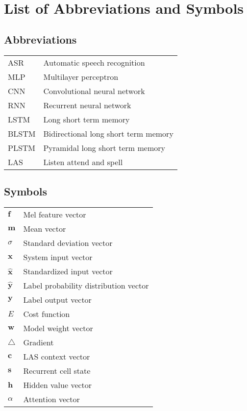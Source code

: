 \documentclass[master=ewit,english,coverpageonly]{kulemt}
\begin{document}
\listoffiguresandtables
\chapter{List of Abbreviations and Symbols}
\section*{Abbreviations}
\begin{flushleft}
  \renewcommand{\arraystretch}{1.1}
  \begin{tabularx}{\textwidth}{@{}p{12mm}X@{}}
    ASR   & Automatic speech recognition \\
    MLP	  & Multilayer perceptron \\
    CNN   & Convolutional neural network \\
    RNN   & Recurrent neural network \\
    LSTM  & Long short term memory \\
    BLSTM & Bidirectional long short term memory \\
    PLSTM & Pyramidal long short term memory \\
    LAS	  & Listen attend and spell
  \end{tabularx}
\end{flushleft}
\section*{Symbols}
\begin{flushleft}
  \renewcommand{\arraystretch}{1.1}
  \begin{tabularx}{\textwidth}{@{}p{12mm}X@{}}
	$\mathbf{f}$ & Mel feature vector \\
	$\mathbf{m}$ & Mean vector \\
	$\sigma$	 & Standard deviation vector \\
	$\mathbf{x}$ & System input vector \\
	$\hat{\mathbf{x}}$ & Standardized input vector \\
	$\hat{\mathbf{y}}$ & Label probability distribution vector \\
	$\mathbf{y}$ & Label output vector \\
	$E$			 & Cost function \\
	$\mathbf{w}$ & Model weight vector \\
	$\triangle$	 & Gradient \\
	$\mathbf{c}$  & LAS context vector \\
	$\mathbf{s}$  & Recurrent cell state \\
	$\mathbf{h}$  & Hidden value vector \\
	$\alpha$	 & Attention vector \\
	
  \end{tabularx}
\end{flushleft}
\end{document}
